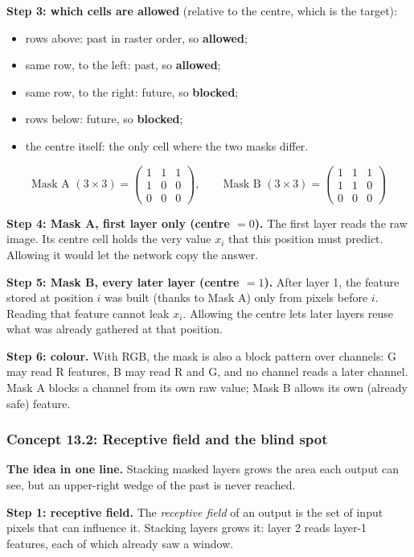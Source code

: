 \documentclass[12pt,a4paper]{article}
\begin{document}
\textbf{Step 3: which cells are allowed} (relative to the centre, which is the target):
\begin{itemize}[nosep]
  \item rows above: past in raster order, so \textbf{allowed};
  \item same row, to the left: past, so \textbf{allowed};
  \item same row, to the right: future, so \textbf{blocked};
  \item rows below: future, so \textbf{blocked};
  \item the centre itself: the only cell where the two masks differ.
\end{itemize}
\[
\text{Mask A }(3\times3)=\begin{pmatrix}1&1&1\\1&0&0\\0&0&0\end{pmatrix},\qquad
\text{Mask B }(3\times3)=\begin{pmatrix}1&1&1\\1&1&0\\0&0&0\end{pmatrix}
\]

\textbf{Step 4: Mask A, first layer only (centre $=0$).} The first layer reads the raw image. Its centre cell holds the very value $x_i$ that this position must predict. Allowing it would let the network copy the answer.

\textbf{Step 5: Mask B, every later layer (centre $=1$).} After layer 1, the feature stored at position $i$ was built (thanks to Mask A) only from pixels before $i$. Reading that feature cannot leak $x_i$. Allowing the centre lets later layers reuse what was already gathered at that position.

\textbf{Step 6: colour.} With RGB, the mask is also a block pattern over channels: G may read R features, B may read R and G, and no channel reads a later channel. Mask A blocks a channel from its own raw value; Mask B allows its own (already safe) feature.

\subsubsection{Concept 13.2: Receptive field and the blind spot}\label{c13-2}

\textbf{The idea in one line.} Stacking masked layers grows the area each output can see, but an upper-right wedge of the past is never reached.

\textbf{Step 1: receptive field.} The \emph{receptive field} of an output is the set of input pixels that can influence it. Stacking layers grows it: layer 2 reads layer-1 features, each of which already saw a window.
\end{document}
